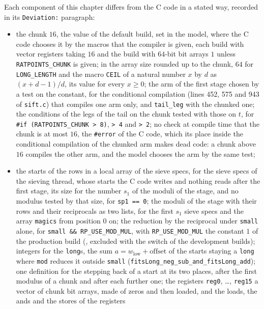 Each component of this chapter differs from the C code in a stated way, recorded in its
\verb|Deviation:| paragraph:
\begin{itemize}
  \item the chunk $16$, the value of the default build, set in the model, where the C code chooses
    it by the macros that the compiler is given, each build with vector registers taking $16$ and
    the build with $64$-bit bit arrays $1$ unless \verb|RATPOINTS_CHUNK| is given; in the array size
    rounded up to the chunk, $64$ for \verb|LONG_LENGTH| and the macro \verb|CEIL| of a natural
    number $x$ by $d$ as $(x + d - 1)/d$, its value for every $x \ge 0$; the arm of the first stage
    chosen by a test on the constant, for the conditional compilation (lines 452, 575 and 943 of
    \verb|sift.c|) that compiles one arm only, and \verb|tail_leg| with the chunked one; the
    conditions of the legs of the tail on the chunk tested with those on $t$, for
    \verb|#if (RATPOINTS_CHUNK > 8)|, \verb|> 4| and \verb|> 2|; no check at compile time that the
    chunk is at most $16$, the \verb|#error| of the C code, which its place inside the conditional
    compilation of the chunked arm makes dead code: a chunk above $16$ compiles the other arm, and
    the model chooses the arm by the same test;
  \item the starts of the rows in a local array of the sieve specs, for the sieve specs of the
  sieving thread, whose starts the C code writes and nothing reads after the first stage, its size
  for the number $s_1$ of the moduli of the stage, and no modulus tested by that size, for
  \verb|sp1 == 0|; the moduli of the stage with their rows and their reciprocals as two lists, for
  the first $s_1$ sieve specs and the array \verb|magics| from position $0$ on; the reduction by the
  reciprocal under \verb|small| alone, for \verb|small && RP_USE_MOD_MUL|, with
  \verb|RP_USE_MOD_MUL| the constant $1$ of the production build (,
  excluded with the switch of the development builds); integers for the \verb|long|s, the sum $a =
  w_{\mathrm{low}} + \mathrm{offset}$ of the starts staying a \verb|long| where \verb|mod| reduces
  it outside \verb|small| (\verb|fitsLong_neg_sub_and_fitsLong_add|); one definition for the
  stepping back of a start at its two places, after the first modulus of a chunk and after each
  further one; the registers \verb|reg0|, \dots, \verb|reg15| a vector of $\mathrm{chunk}$ bit
  arrays, made of zeros and then loaded, and the loads, the ands and the stores of the registers

\end{itemize}
